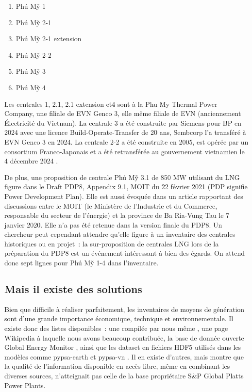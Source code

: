 \documentclass[a4paper,11pt]{report}
\providecommand{\tightlist}{\setlength{\itemsep}{0pt}\setlength{\parskip}{0pt}}
\begin{document}
\begin{enumerate}
\def\labelenumi{\arabic{enumi})}
\tightlist
\item
  Phú Mỹ 1
\item
  Phú Mỹ 2-1
\item
  Phú Mỹ 2-1 extension
\item
  Phú Mỹ 2-2
\item
  Phú Mỹ 3
\item
  Phú Mỹ 4
\end{enumerate}

Les centrales 1, 2.1, 2.1 extension et4 sont à la Phu My Thermal Power Company, une filiale de EVN Genco 3, elle même filiale de EVN (anciennement Électricité du Vietnam). La centrale 3 a été construite par Siemens pour BP en 2024 avec une licence Build-Operate-Transfer de 20 ans, Sembcorp l'a transféré à EVN Genco 3 en 2024. La centrale 2-2 a été construite en 2005, est opérée par un consortium Franco-Japonais et a été retransférée au gouvernement vietnamien le 4 décembre 2024 \citep{UAWJD84R}.

De plus, une proposition de centrale Phú Mỹ 3.1 de 850 MW utilisant du LNG figure dans le Draft PDP8, Appendix 9.1, MOIT du 22 février 2021 (PDP signifie Power Development Plan). Elle est aussi évoquée dans un article rapportant des discussions entre le MOIT (le Ministère de l'Industrie et du Commerce, responsable du secteur de l'énergie) et la province de Ba Ria-Vung Tau le 7 janvier 2020. Elle n'a pas été retenue dans la version finale du PDP8. Un chercheur peut cependant attendre qu'elle figure à un inventaire des centrales historiques ou en projet~: la sur-proposition de centrales LNG lors de la préparation du PDP8 est un événement intéressant à bien des égards. On attend donc sept lignes pour Phú Mỹ 1-4 dans l'inventaire.

\subsection{Mais il existe des solutions}\label{mais-il-existe-des-solutions}

Bien que difficile à réaliser parfaitement, les inventaires de moyens de génération sont d'une grande importance économique, technique et environnementale. Il existe donc des listes disponibles~: une compilée par nous même \citep{NLN8GPNI}, une page Wikipedia \citep{TQ8TFB8H} à laquelle nous avons beaucoup contribuée, la base de donnée ouverte Global Energy Monitor \citep{LCVI7NAT}, ainsi que les dataset en fichiers HDF5 utilisés dans les modèles comme pypsa-earth \citep{UMGUESAZ} et pypsa-vn \citep{VGASHFPT}. Il en existe d'autres, mais \citep{LYGDCQCL} montre que la qualité de l'information disponible en accès libre, même en combinant les diverses sources, n'atteignait pas celle de la base propriétaire S\&P Global Platts Power Plants.
\end{document}
